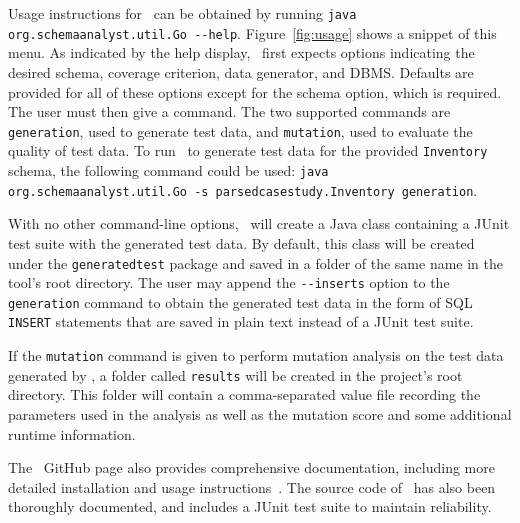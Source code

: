 


Usage instructions for \sa~can be obtained by running \lstinline{java org.schemaanalyst.util.Go --help}.
Figure~\ref{fig:usage} shows a snippet of this menu.  As indicated by the help display, \sa~first expects options
indicating the desired schema, coverage criterion, data generator, and DBMS\@. Defaults are provided for all of these
options except for the schema option, which is required. The user must then give a command.  The two supported commands
are \lstinline{generation}, used to generate test data, and \lstinline{mutation}, used to evaluate the quality of test
data.  To run \sa~to generate test data for the provided \texttt{Inventory} schema, the following command could be used:
\lstinline{java org.schemaanalyst.util.Go -s parsedcasestudy.Inventory generation}.


With no other command-line options, \sa~will create a Java class containing a JUnit test suite with the generated test
data. By default, this class will be created under the \texttt{generatedtest} package and saved in a folder of the same
name in the tool's root directory.  The user may append the \lstinline{--inserts} option to the \lstinline{generation}
command to obtain the generated test data in the form of SQL \texttt{INSERT} statements that are saved in plain text
instead of a JUnit test suite.




If the \lstinline{mutation} command is given to perform mutation analysis on the test data generated by \sa, a folder
called \lstinline{results} will be created in the project's root directory. This folder will contain a comma-separated
value file recording the parameters used in the analysis as well as the mutation score and some additional runtime
information.

The \sa~GitHub page also provides comprehensive documentation, including more detailed installation and
usage instructions~\cite{tool}. The source code of \sa~has also been thoroughly documented, and includes a JUnit test
suite to maintain reliability.



